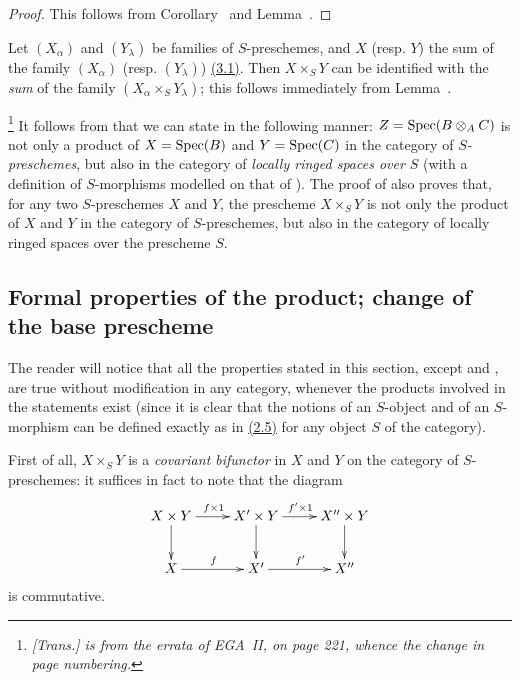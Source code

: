 \begin{proof}
\label{proof-I.3.2.7}
This follows from Corollary~ and Lemma~.
\end{proof}

\begin{env}[3.2.8]
\label{I.3.2.8}
Let $(X_\alpha)$ and $(Y_\lambda)$ be families of $S$-preschemes, and $X$ (resp. $Y$) the sum
of the family $(X_\alpha)$ (resp. $(Y_\lambda)$) \hyperref[subsection:I.3.1]{(3.1)}.
Then $X\times_S Y$ can be identified with the \emph{sum} of the family $(X_\alpha\times_S Y_\lambda)$; this follows immediately from Lemma~.
\end{env}

\begin{env}[3.2.9]
\label{I.3.2.9}
\footnote{\emph{[Trans.]  is from the errata of EGA~II, on page 221, whence the change in page numbering.}}
It follows from  that we can state  in the following
manner: $Z=\operatorname{Spec}(B\otimes_A C)$ is not only a product of $X=\operatorname{Spec}(B)$ and $Y=\operatorname{Spec}(C)$ in the
category of \emph{$S$-preschemes}, but also in the category of \emph{locally ringed spaces
over $S$} (with a definition of $S$-morphisms modelled on that of ). The
proof of  also proves that, for any two $S$-preschemes $X$ and $Y$, the
prescheme $X\times_S Y$ is not only the product of $X$ and $Y$ in the category of
$S$-preschemes, but also in the category of locally ringed spaces over the prescheme $S$.
\end{env}

\subsection{Formal properties of the product; change of the base prescheme}
\label{subsection:I.3.3}

\begin{env}[3.3.1]
\label{I.3.3.1}
The reader will notice that all the properties stated in this section, except
 and , are true without modification in any
category, whenever the products involved in the statements exist (since it is
clear that the notions of an $S$-object and of an $S$-morphism can be defined
exactly as in \hyperref[subsection:I.2.5]{(2.5)} for any object $S$ of the category).
\end{env}

\begin{env}[3.3.2]
\label{I.3.3.2}
First of all, $X\times_S Y$ is a \emph{covariant bifunctor} in $X$ and $Y$ on the
category of $S$-preschemes: it suffices in fact to note that the diagram
\[
  \xymatrix{
    X\times Y\ar[r]^{f\times 1}\ar[d] &
    X'\times Y\ar[r]^{f'\times 1}\ar[d] &
    X''\times Y\ar[d]\\
    X\ar[r]^f &
    X'\ar[r]^{f'} &
    X''
  }
\]
is commutative.
\end{env}

